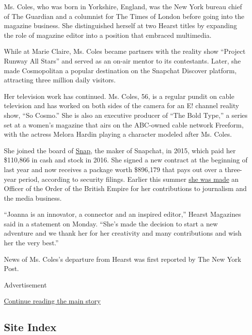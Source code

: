 Ms. Coles, who was born in Yorkshire, England, was the New York bureau
chief of The Guardian and a columnist for The Times of London before
going into the magazine business. She distinguished herself at two
Hearst titles by expanding the role of magazine editor into a position
that embraced multimedia.

While at Marie Claire, Ms. Coles became partners with the reality show
``Project Runway All Stars'' and served as an on-air mentor to its
contestants. Later, she made Cosmopolitan a popular destination on the
Snapchat Discover platform, attracting three million daily visitors.

Her television work has continued. Ms. Coles, 56, is a regular pundit on
cable television and has worked on both sides of the camera for an E!
channel reality show, ``So Cosmo.'' She is also an executive producer of
``The Bold Type,'' a series set at a women's magazine that airs on the
ABC-owned cable network Freeform, with the actress Melora Hardin playing
a character modeled after Ms. Coles.

She joined the board of
\href{https://investor.snap.com/corporate-governance/officers-and-directors/independent-directors}{Snap},
the maker of Snapchat, in 2015, which paid her \$110,866 in cash and
stock in 2016. She signed a new contract at the beginning of last year
and now receives a package worth \$896,179 that pays out over a
three-year period, according to security filings. Earlier this summer
\href{https://www.townandcountrymag.com/society/tradition/a21238867/joanna-coles-obe-queen-elizabeth/}{she
was made} an Officer of the Order of the British Empire for her
contributions to journalism and the media business.

``Joanna is an innovator, a connector and an inspired editor,'' Hearst
Magazines said in a statement on Monday. ``She's made the decision to
start a new adventure and we thank her for her creativity and many
contributions and wish her the very best.''

News of Ms. Coles's departure from Hearst was first reported by The New
York Post.

Advertisement

\protect\hyperlink{after-bottom}{Continue reading the main story}

\hypertarget{site-index}{%
\subsection{Site Index}\label{site-index}}

